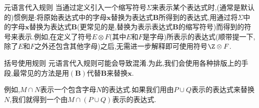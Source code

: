 \begin{remark}{元语言代入规则}{}
	当通过定义引入一个缩写符号$\Sigma$来表示某个表达式时,(通常是默认的)惯例是:将原始表达式中的字母$\boldsymbol{x}$替换为表达式$\boldsymbol{B}$所得到的表达式,用通过将$\Sigma$中的字母$\boldsymbol{x}$替换为表达式$\boldsymbol{B}$(更常见的是,替换为表示表达式$\boldsymbol{B}$的缩写符号)而得到的符号来表示.例如,在定义了符号$E\otimes F$(其中$E$和$F$是字母)所表示的表达式(顺带提一下,除了$E$和$F$之外还包含其他字母)之后,无需进一步解释即可使用符号$\Z\otimes F$.
\end{remark}

\begin{remark}{括号使用规则}{}
	元语言代入规则可能会导致混淆.为此,我们会使用各种排版上的手段,最常见的方法是用$\left(\boldsymbol{B}\right)$代替$\boldsymbol{B}$来替换$\boldsymbol{x}$.
	
	例如,$M\cap N$表示一个包含字母$N$的表达式.如果我们用由$P\cup Q$表示的表达式来替换$N$,我们就得到一个由$M\cap\left(P\cup Q\right)$表示的表达式.
\end{remark}
